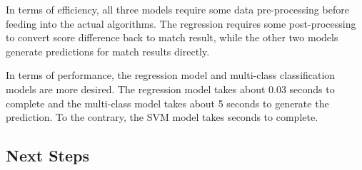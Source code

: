 \documentclass[12pt]{article}
\begin{document}
In terms of efficiency, all three models require some data pre-processing before feeding into the actual algorithms. The regression requires some post-processing to convert score difference back to match result, while the other two models generate predictions for match results directly.

In terms of performance, the regression model and multi-class classification models are more desired. The regression model takes about 0.03 seconds to complete and the multi-class model takes about 5 seconds to generate the prediction. To the contrary, the SVM model takes seconds to complete.

\subsection{Next Steps}
\end{document}
